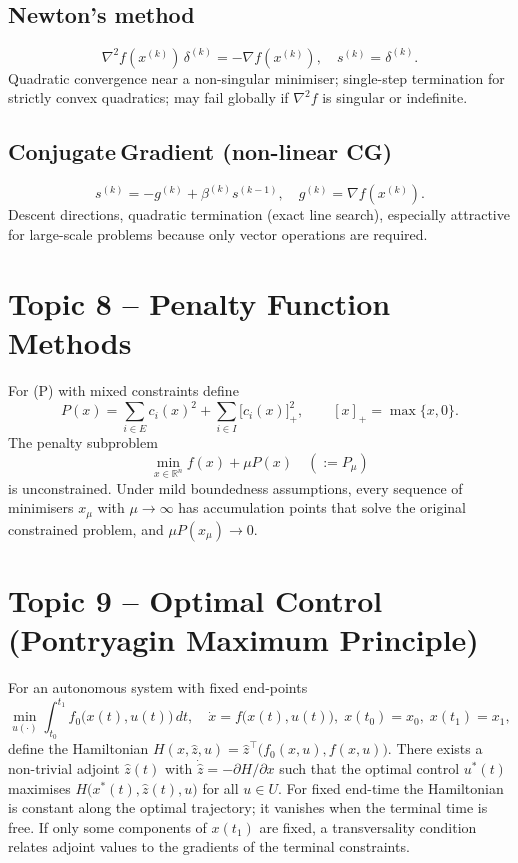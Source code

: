 \documentclass[12pt]{article}
\begin{document}
\subsection{Newton’s method}
\[
\nabla^{2}f(x^{(k)})\,\delta^{(k)}=-\nabla f(x^{(k)}),\quad
s^{(k)}=\delta^{(k)}.
\]
Quadratic convergence near a non-singular minimiser; single-step
termination for strictly convex quadratics; may fail globally if
\(\nabla^{2}f\) is singular or indefinite.

\subsection{Conjugate Gradient (non-linear CG)}
\[
s^{(k)}=-g^{(k)}+\beta^{(k)}s^{(k-1)},\quad
g^{(k)}=\nabla f(x^{(k)}).
\]
Descent directions, quadratic termination (exact line search), especially
attractive for large-scale problems because only vector operations are
required.

\section{Topic 8 – Penalty Function Methods}

For (P) with mixed constraints define
\[
P(x)=\sum_{i\in E} c_i(x)^2 +
       \sum_{i\in I} \bigl[c_i(x)\bigr]_+^2,\qquad
[x]_+=\max\{x,0\}.
\]
The penalty subproblem
\[
\min_{x\in\mathbb R^n} f(x)+\mu P(x)\quad(:=P_\mu)
\]
is unconstrained.  Under mild boundedness assumptions, every sequence of
minimisers \(x_\mu\) with \(\mu\to\infty\) has accumulation points that
solve the original constrained problem, and \(\mu P(x_\mu)\to0\).

\section{Topic 9 – Optimal Control (Pontryagin Maximum Principle)}

For an autonomous system with fixed end-points
\[
\min_{u(\cdot)}\int_{t_0}^{t_1} f_0\bigl(x(t),u(t)\bigr)\,dt,\quad
\dot x=f\bigl(x(t),u(t)\bigr),\;
x(t_0)=x_0,\;x(t_1)=x_1,
\]
define the Hamiltonian
\(H(x,\hat z,u)=\hat z^\top\!\bigl(f_0(x,u),f(x,u)\bigr)\).
There exists a non-trivial adjoint \(\hat z(t)\) with
\(\dot{\hat z}=-\partial H/\partial x\) such that the optimal control
\(u^\ast(t)\) maximises \(H\bigl(x^\ast(t),\hat z(t),u\bigr)\) for all
\(u\in U\).  For fixed end-time the Hamiltonian is constant along the
optimal trajectory; it vanishes when the terminal time is free.  If only
some components of \(x(t_1)\) are fixed, a transversality condition
relates adjoint values to the gradients of the terminal constraints.

\end{document}
